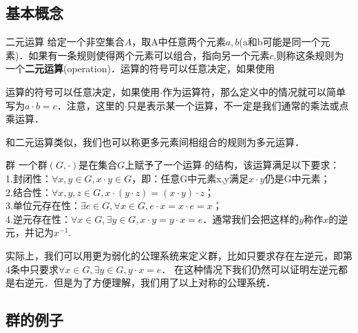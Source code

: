 
\subsection{基本概念}

\begin{definition}{二元运算}
给定一个非空集合$A$，取A中任意两个元素$a, b$(a和b可能是同一个元素)．如果有一条规则使得两个元素可以组合，指向另一个元素$c$,则称这条规则为一个\textbf{二元运算}(operation)．运算的符号可以任意决定，如果使用
\end{definition}

运算的符号可以任意决定，如果使用$\cdot$作为运算符，那么定义中的情况就可以简单写为$a\cdot b=c$．注意，这里的$\cdot$只是表示某一个运算，不一定是我们通常的乘法或点乘运算．

和二元运算类似，我们也可以称更多元素间相组合的规则为多元运算．

\begin{definition}{群}
一个群$(G, \cdot)$是在集合$G$上赋予了一个运算$\cdot$的结构，该运算满足以下要求：\\


1.封闭性：$\forall x, y\in G, x\cdot y\in G$，即：任意G中元素x,y满足$x\cdot y$仍是G中元素；\\

2.结合性：$\forall x, y, z\in G, x\cdot(y\cdot z)=(x\cdot y)\cdot z$；\\

3.单位元存在性：$\exists e\in G, \forall x\in G, e\cdot x=x\cdot e=x$；\\

4.逆元存在性：$\forall x\in G, \exists y\in G, x\cdot y=y\cdot x=e$．通常我们会把这样的$y$称作$x$的逆元，并记为$x^{-1}$. 

\end{definition}

实际上，我们可以用更为弱化的公理系统来定义群，比如只要求存在左逆元，即第4条中只要求$\forall x\in G, \exists y\in G, y\cdot x=e$． 在这种情况下我们仍然可以证明左逆元都是右逆元．但是为了方便理解，我们用了以上对称的公理系统．

\subsection{群的例子}